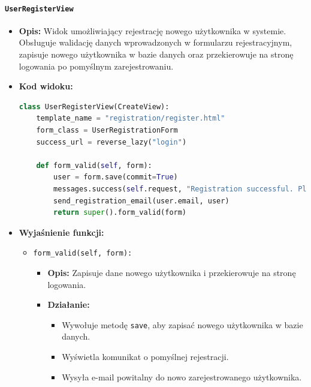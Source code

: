 \documentclass[12pt,a4paper,oneside]{article}
\theoremstyle{definition}
\numberwithin{equation}{section}
\begin{document}
\paragraph{\texttt{UserRegisterView}}
\begin{itemize}
    \item \textbf{Opis:} Widok umożliwiający rejestrację nowego użytkownika w systemie. Obsługuje walidację danych wprowadzonych w formularzu rejestracyjnym, zapisuje nowego użytkownika w bazie danych oraz przekierowuje na stronę logowania po pomyślnym zarejestrowaniu.
    \item \textbf{Kod widoku:}
    \begin{lstlisting}[language=Python, caption=\texttt{UserRegisterView}]
class UserRegisterView(CreateView):
    template_name = "registration/register.html"
    form_class = UserRegistrationForm
    success_url = reverse_lazy("login")

    def form_valid(self, form):
        user = form.save(commit=True)
        messages.success(self.request, "Registration successful. Please log in.")
        send_registration_email(user.email, user)
        return super().form_valid(form)
    \end{lstlisting}

    \item \textbf{Wyjaśnienie funkcji:}
    \begin{itemize}
        \item \texttt{form\_valid(self, form):}
        \begin{itemize}
            \item \textbf{Opis:} Zapisuje dane nowego użytkownika i przekierowuje na stronę logowania.
            \item \textbf{Działanie:}
            \begin{itemize}
                \item Wywołuje metodę \texttt{save}, aby zapisać nowego użytkownika w bazie danych.
                \item Wyświetla komunikat o pomyślnej rejestracji.
                \item Wysyła e-mail powitalny do nowo zarejestrowanego użytkownika.
            \end{itemize}
        \end{itemize}
    \end{itemize}
\end{itemize}
\end{document}
